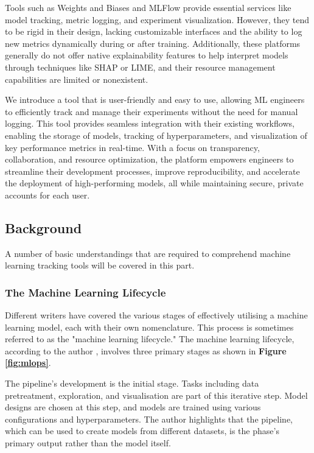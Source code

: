 \documentclass[12pt]{article}
\begin{document}
Tools such as Weights and Biases and MLFlow provide essential services like model tracking, metric logging, and experiment visualization. However, they tend to be rigid in their design, lacking customizable interfaces and the ability to log new metrics dynamically during or after training. Additionally, these platforms generally do not offer native explainability features to help interpret models through techniques like SHAP or LIME, and their resource management capabilities are limited or nonexistent. 

We introduce a tool that is user-friendly and easy to use, allowing ML engineers to efficiently track and manage their experiments without the need for manual logging. This tool provides seamless integration with their existing workflows, enabling the storage of models, tracking of hyperparameters, and visualization of key performance metrics in real-time. With a focus on transparency, collaboration, and resource optimization, the platform empowers engineers to streamline their development processes, improve reproducibility, and accelerate the deployment of high-performing models, all while maintaining secure, private accounts for each user.

\subsection{Background}
A number of basic understandings that are required to comprehend machine learning tracking tools will be covered in this part.

\subsubsection{The Machine Learning Lifecycle}
Different writers have covered the various stages of effectively utilising a machine learning model, each with their own nomenclature. This process is sometimes referred to as the "machine learning lifecycle." The machine learning lifecycle, according to the author \cite{garcia2018context}, involves three primary stages as shown in \textbf{Figure \ref{fig:mlops}}.

The pipeline's development is the initial stage. Tasks including data pretreatment, exploration, and visualisation are part of this iterative step. Model designs are chosen at this step, and models are trained using various configurations and hyperparameters. The author highlights that the pipeline, which can be used to create models from different datasets, is the phase's primary output rather than the model itself.
\end{document}
